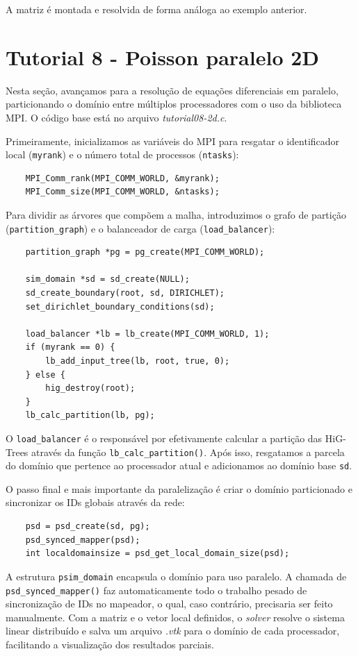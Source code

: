 A matriz é montada e resolvida de forma análoga ao exemplo anterior.


\section{Tutorial 8 - Poisson paralelo 2D}
\label{sec:tut8}

Nesta seção, avançamos para a resolução de equações diferenciais em paralelo, particionando o domínio entre múltiplos processadores com o uso da biblioteca MPI. O código base está no arquivo \textit{tutorial08-2d.c}. 

Primeiramente, inicializamos as variáveis do MPI para resgatar o identificador local (\texttt{myrank}) e o número total de processos (\texttt{ntasks}):
\begin{verbatim}
    MPI_Comm_rank(MPI_COMM_WORLD, &myrank);
    MPI_Comm_size(MPI_COMM_WORLD, &ntasks);
\end{verbatim}

Para dividir as árvores que compõem a malha, introduzimos o grafo de partição (\texttt{partition\_graph}) e o balanceador de carga (\texttt{load\_balancer}):
\begin{verbatim}
    partition_graph *pg = pg_create(MPI_COMM_WORLD);
    
    sim_domain *sd = sd_create(NULL);
    sd_create_boundary(root, sd, DIRICHLET);
    set_dirichlet_boundary_conditions(sd);

    load_balancer *lb = lb_create(MPI_COMM_WORLD, 1);
    if (myrank == 0) {
        lb_add_input_tree(lb, root, true, 0);
    } else {
        hig_destroy(root);
    }
    lb_calc_partition(lb, pg);
\end{verbatim}
O \texttt{load\_balancer} é o responsável por efetivamente calcular a partição das HiG-Trees através da função \texttt{lb\_calc\_partition()}. Após isso, resgatamos a parcela do domínio que pertence ao processador atual e adicionamos ao domínio base \texttt{sd}.

O passo final e mais importante da paralelização é criar o domínio particionado e sincronizar os IDs globais através da rede:
\begin{verbatim}
    psd = psd_create(sd, pg);
    psd_synced_mapper(psd); 
    int localdomainsize = psd_get_local_domain_size(psd);
\end{verbatim}
A estrutura \texttt{psim\_domain} encapsula o domínio para uso paralelo. A chamada de \texttt{psd\_synced\_mapper()} faz automaticamente todo o trabalho pesado de sincronização de IDs no mapeador, o qual, caso contrário, precisaria ser feito manualmente. Com a matriz e o vetor local definidos, o \textit{solver} resolve o sistema linear distribuído e salva um arquivo \textit{.vtk} para o domínio de cada processador, facilitando a visualização dos resultados parciais.

